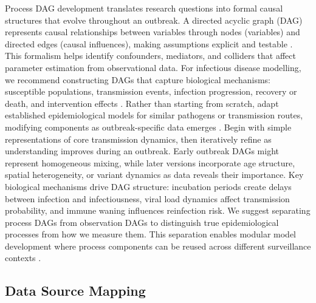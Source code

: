 \documentclass{article}
\begin{document}
Process DAG development translates research questions into formal causal structures that evolve throughout an outbreak.
A directed acyclic graph (DAG) represents causal relationships between variables through nodes (variables) and directed edges (causal influences), making assumptions explicit and testable \citep{digitale2022tutorial}.
This formalism helps identify confounders, mediators, and colliders that affect parameter estimation from observational data.
For infectious disease modelling, we recommend constructing DAGs that capture biological mechanisms: susceptible populations, transmission events, infection progression, recovery or death, and intervention effects \citep{deangelis2018analysing}.
Rather than starting from scratch, adapt established epidemiological models for similar pathogens or transmission routes, modifying components as outbreak-specific data emerges \citep{gelman2020bayesian}.
Begin with simple representations of core transmission dynamics, then iteratively refine as understanding improves during an outbreak.
Early outbreak DAGs might represent homogeneous mixing, while later versions incorporate age structure, spatial heterogeneity, or variant dynamics as data reveals their importance.
Key biological mechanisms drive DAG structure: incubation periods create delays between infection and infectiousness, viral load dynamics affect transmission probability, and immune waning influences reinfection risk.
We suggest separating process DAGs from observation DAGs to distinguish true epidemiological processes from how we measure them.
This separation enables modular model development where process components can be reused across different surveillance contexts \citep{nicholson2022interoperability}.

\subsection{Data Source Mapping}
\end{document}
